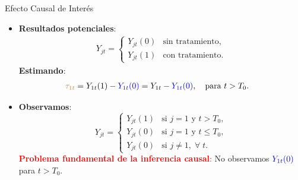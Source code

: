 \documentclass[10pt, xcolor=dvipsnames]{beamer}
\begin{document}
\begin{frame}{Efecto Causal de Interés}
\begin{itemize}
    \item \textbf{Resultados potenciales}:
    \begin{align*}
        Y_{jt} = 
        \begin{cases}
            Y_{jt}(0) & \text{sin tratamiento}, \\
            Y_{jt}(1) & \text{con tratamiento}.
        \end{cases}
    \end{align*}    
    \vspace{-0.75em}
    \textbf{Estimando}:
    \begin{align*}
        \textcolor{brown}{\tau_{1t}} &= Y_{1t}(1) - \textcolor{blue}{Y_{1t}(0)} = Y_{1t} - \textcolor{blue}{Y_{1t}(0)}, \quad \text{para } t > T_0.
    \end{align*}
    \vspace{-1.5em}
    \item \textbf{Observamos}:
    \[
    Y_{jt} = 
    \begin{cases} 
        Y_{jt}(1) & \text{si } j = 1 \text{ y } t > T_0, \\[0.1cm]
        Y_{jt}(0) & \text{si } j = 1 \text{ y } t \leq T_0, \\[0.1cm]
        Y_{jt}(0) & \text{si } j \neq 1, \; \forall \; t.
    \end{cases}
    \]   
    \textcolor{red}{\textbf{Problema fundamental de la inferencia causal}:} No observamos $\textcolor{blue}{Y_{1t}(0)}$ para $t > T_0$.
\end{itemize}
\end{frame}
\end{document}
